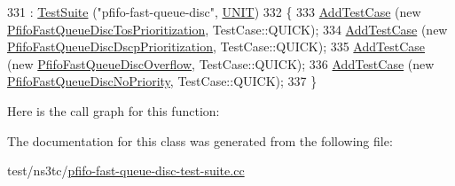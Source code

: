 \begin{DoxyCode}
331   : \hyperlink{classns3_1_1TestSuite_a904b0c40583b744d30908aeb94636d1a}{TestSuite} (\textcolor{stringliteral}{"pfifo-fast-queue-disc"}, \hyperlink{classns3_1_1TestSuite_a1ebfcab34ec8161e085e8e3a1855eae0a3885375a3787abf60431f8454b3cadbd}{UNIT})
332 \{
333   \hyperlink{classns3_1_1TestCase_a3718088e3eefd5d6454569d2e0ddd835}{AddTestCase} (\textcolor{keyword}{new} \hyperlink{classPfifoFastQueueDiscTosPrioritization}{PfifoFastQueueDiscTosPrioritization}, 
      TestCase::QUICK);
334   \hyperlink{classns3_1_1TestCase_a3718088e3eefd5d6454569d2e0ddd835}{AddTestCase} (\textcolor{keyword}{new} \hyperlink{classPfifoFastQueueDiscDscpPrioritization}{PfifoFastQueueDiscDscpPrioritization}, 
      TestCase::QUICK);
335   \hyperlink{classns3_1_1TestCase_a3718088e3eefd5d6454569d2e0ddd835}{AddTestCase} (\textcolor{keyword}{new} \hyperlink{classPfifoFastQueueDiscOverflow}{PfifoFastQueueDiscOverflow}, TestCase::QUICK);
336   \hyperlink{classns3_1_1TestCase_a3718088e3eefd5d6454569d2e0ddd835}{AddTestCase} (\textcolor{keyword}{new} \hyperlink{classPfifoFastQueueDiscNoPriority}{PfifoFastQueueDiscNoPriority}, TestCase::QUICK);
337 \}
\end{DoxyCode}


Here is the call graph for this function\+:




The documentation for this class was generated from the following file\+:\begin{DoxyCompactItemize}
\item 
test/ns3tc/\hyperlink{pfifo-fast-queue-disc-test-suite_8cc}{pfifo-\/fast-\/queue-\/disc-\/test-\/suite.\+cc}\end{DoxyCompactItemize}
